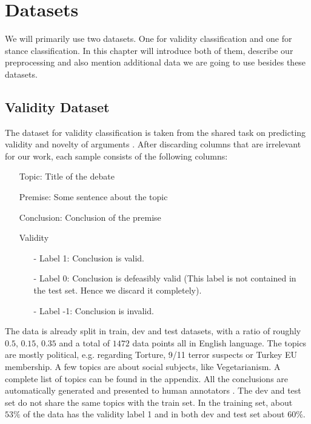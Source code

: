 \section{Datasets}

We will primarily use two datasets. One for validity classification and one for stance classification. In this chapter will introduce both of them, describe our preprocessing and also mention additional data we are going to use besides these datasets.

\subsection{Validity Dataset}

The dataset for validity classification is taken from the shared task on predicting validity and novelty of arguments \cite{argsvalidnovel2022}. After discarding columns that are irrelevant for our work, each sample consists of the following columns:
\begin{enumerate}
	\item[\textbullet] Topic: Title of the debate
	\item[\textbullet] Premise: Some sentence about the topic
	\item[\textbullet] Conclusion: Conclusion of the premise
	\item[\textbullet] Validity
	\begin{enumerate}
		\item[-] Label 1: Conclusion is valid.
		\item[-] Label 0: Conclusion is defeasibly valid (This label is not contained in the test set. Hence we discard it completely).
		\item[-] Label -1: Conclusion is invalid.
	\end{enumerate}
\end{enumerate}
The data is already split in train, dev and test datasets, with a ratio of roughly $0.5$, $0.15$, $0.35$ and a total of $1472$ data points all in English language. The topics are mostly political, e.g. regarding Torture, 9/11 terror suspects or Turkey EU membership. A few topics are about social subjects, like Vegetarianism. A complete list of topics can be found in the appendix. All the conclusions are automatically generated and presented to human annotators \cite{argsvalidnovel2022}. The dev and test set do not share the same topics with the train set. In the training set, about $53\%$ of the data has the validity label 1 and in both dev and test set about $60\%$.

